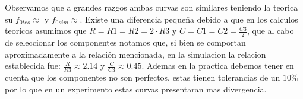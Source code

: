 
Observamos que a grandes razgos ambas curvas son similares teniendo la teorica su $f_{0teo} \approx $ y $f_{0sim} \approx $. Existe una diferencia pequeña debido a que en los calculos teoricos asumimos que $R = R1 = R2 = 2 \cdot R3$ y $C = C1 = C2 = \frac{C3}{2}$, que al cabo de seleccionar los componentes notamos que, si bien se comportan aproximadamente a la relación mencionada, en la simulacion la relacion establecida fue: $\frac{R}{R3} \approx 2.14$ y $\frac{C}{C3} \approx 0.45$. Ademas en la practica debemos tener en cuenta que los componentes no son perfectos, estas tienen tolerancias de un $10\%$ por lo que en un experimento estas curvas presentaran mas divergencia. 
